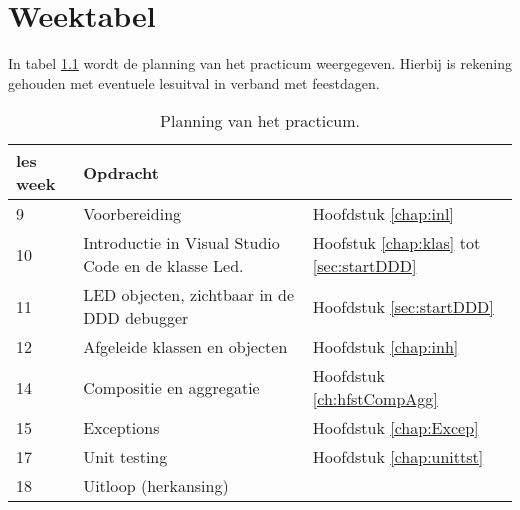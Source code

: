 \chapter{Weektabel}

In tabel \ref{tabel:wkplan} wordt de planning van het practicum weergegeven. 
Hierbij is rekening gehouden met eventuele lesuitval in verband met feestdagen. 
\begin{table}[h!]
	\begin{tabular}{ | m{1.8em} | m{7cm} |l| } 
		\hline
les week &Opdracht &  \\ \hline
	 9  &Voorbereiding & Hoofdstuk \ref{chap:inl} \\	\hline
	10	& Introductie in Visual Studio Code en de klasse Led. & Hoofstuk \ref{chap:klas} tot \ref{sec:startDDD} \\ \hline
	11	&   LED objecten, zichtbaar in de DDD debugger &  Hoofdstuk \ref{sec:startDDD} \\ \hline
	12	&  Afgeleide klassen en objecten & Hoofdstuk \ref{chap:inh} \\ \hline
	14	&Compositie en aggregatie    & Hoofdstuk \ref{ch:hfstCompAgg} \\ \hline
	15	& Exceptions   & Hoofdstuk \ref{chap:Excep} \\ \hline
	17	&Unit testing  & Hoofdstuk \ref{chap:unittst} \\ \hline	
	18 &Uitloop (herkansing)&\\ \hline
	\end{tabular}  
    \caption{Planning van het practicum.}
    \label{tabel:wkplan}
\end{table}

